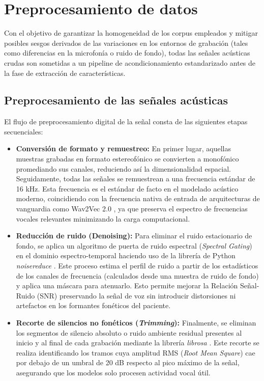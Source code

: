 \section{Preprocesamiento de datos}

    Con el objetivo de garantizar la homogeneidad de los corpus empleados y mitigar posibles sesgos derivados de las variaciones en los entornos de grabación (tales como diferencias en la microfonía o ruido de fondo), todas las señales acústicas crudas son sometidas a un pipeline de acondicionamiento estandarizado antes de la fase de extracción de características.

    \subsection{Preprocesamiento de las señales acústicas}

        El flujo de preprocesamiento digital de la señal consta de las siguientes etapas secuenciales:

        \begin{itemize}
            \item \textbf{Conversión de formato y remuestreo:} En primer lugar, aquellas muestras grabadas en formato estereofónico se convierten a monofónico promediando sus canales, reduciendo así la dimensionalidad espacial. Seguidamente, todas las señales se remuestrean a una frecuencia estándar de 16 kHz. Esta frecuencia es el estándar de facto en el modelado acústico moderno, coincidiendo con la frecuencia nativa de entrada de arquitecturas de vanguardia como Wav2Vec 2.0 \cite{baevski2020}, ya que preserva el espectro de frecuencias vocales relevantes minimizando la carga computacional.
            
            \item \textbf{Reducción de ruido (Denoising):} Para eliminar el ruido estacionario de fondo, se aplica un algoritmo de puerta de ruido espectral (\textit{Spectral Gating}) en el dominio espectro-temporal haciendo uso de la librería de Python \textit{noisereduce} \cite{sainburg2024}. Este proceso estima el perfil de ruido a partir de los estadísticos de los canales de frecuencia (calculados desde una muestra de ruido de fondo) y aplica una máscara para atenuarlo. Esto permite mejorar la Relación Señal-Ruido (SNR) preservando la señal de voz sin introducir distorsiones ni artefactos en los formantes fonéticos del paciente.
                
            \item \textbf{Recorte de silencios no fonéticos (\textit{Trimming}):} Finalmente, se eliminan los segmentos de silencio absoluto o ruido ambiente residual presentes al inicio y al final de cada grabación mediante la librería \textit{librosa} \cite{mcfee2015}. Este recorte se realiza identificando los tramos cuya amplitud RMS (\textit{Root Mean Square}) cae por debajo de un umbral de 20 dB respecto al pico máximo de la señal, asegurando que los modelos solo procesen actividad vocal útil.
        \end{itemize}

